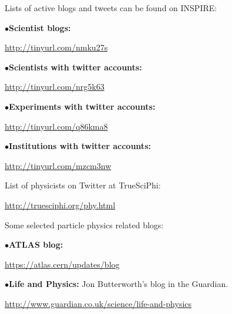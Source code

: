 \medskip


\medskip

Lists of active blogs and tweets can be found on INSPIRE:

\item{$\bullet$}{\bf Scientist blogs:} 
	\item{}\qquad\url{http://tinyurl.com/nmku27s}

\vfil\eject

\item{$\bullet$}{\bf Scientists with twitter accounts:} 
	\item{}\qquad\url{http://tinyurl.com/nrg5k63}

\item{$\bullet$}{\bf Experiments with twitter accounts:} 
	\item{}\qquad\url{http://tinyurl.com/q86kma8}

\item{$\bullet$}{\bf Institutions with twitter accounts:} 
	\item{}\qquad\url{http://tinyurl.com/mzcm3nw}

\medskip

List of physicists on Twitter at TrueSciPhi:

	\item{}\qquad\url{http://truesciphi.org/phy.html}

\medskip

Some selected particle physics related blogs:
 
\medskip

\item{$\bullet$}{\bf ATLAS blog:}
	\item{}\qquad\url{https://atlas.cern/updates/blog}





\medskip

\item{$\bullet$}{\bf Life and Physics:}
Jon Butterworth's blog in the Guardian.
	\item{}\qquad\url{http://www.guardian.co.uk/science/life-and-physics}

